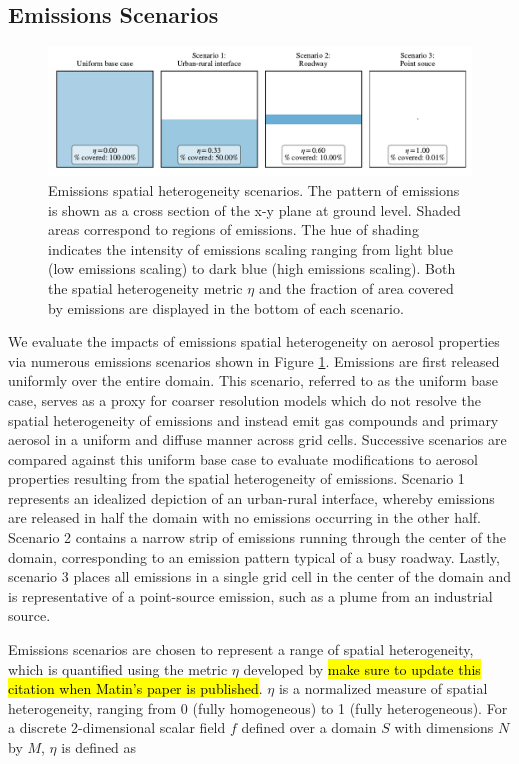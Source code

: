 \documentclass[journal abbreviation, manuscript]{copernicus}
\begin{document}
\subsection{Emissions Scenarios}

\begin{figure}[!t]
	\centering
	\includegraphics[]{figures/SH-scenarios.pdf}
	\caption{Emissions spatial heterogeneity scenarios. The pattern of emissions is shown as a cross section of the x-y plane at ground level. Shaded areas correspond to regions of emissions. The hue of shading indicates the intensity of emissions scaling ranging from light blue (low emissions scaling) to dark blue (high emissions scaling). Both the spatial heterogeneity metric $\eta$ and the fraction of area covered by emissions are displayed in the bottom of each scenario.}
	\label{fig:sh-scenarios}
\end{figure} 

We evaluate the impacts of emissions spatial heterogeneity on aerosol properties via numerous emissions scenarios shown in Figure \ref{fig:sh-scenarios}. Emissions are first released uniformly over the entire domain. This scenario, referred to as the uniform base case, serves as a proxy for coarser resolution models which do not resolve the spatial heterogeneity of emissions and instead emit gas compounds and primary aerosol in a uniform and diffuse manner across grid cells. Successive scenarios are compared against this uniform base case to evaluate modifications to aerosol properties resulting from the spatial heterogeneity of emissions. Scenario 1 represents an idealized depiction of an urban-rural interface, whereby emissions are released in half the domain with no emissions occurring in the other half. Scenario 2 contains a narrow strip of emissions running through the center of the domain, corresponding to an emission pattern typical of a busy roadway. Lastly, scenario 3 places all emissions in a single grid cell in the center of the domain and is representative of a point-source emission, such as a plume from an industrial source.  

Emissions scenarios are chosen to represent a range of spatial heterogeneity, which is quantified using the metric $\eta$ developed by \citep{mohebalhojeh_2024} \hl{make sure to update this citation when Matin's paper is published}. $\eta$  is a normalized measure of spatial heterogeneity, ranging from 0 (fully homogeneous) to 1 (fully heterogeneous). For a discrete 2-dimensional scalar field $f$ defined over a domain $S$ with dimensions $N$ by $M$, $\eta$ is defined as 
\end{document}

